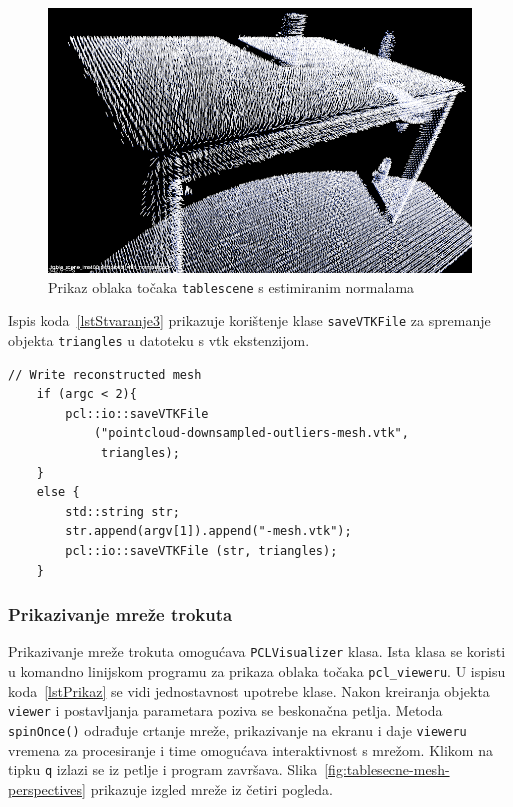 
\begin{figure}[h]
\centering
\includegraphics[scale=0.5]{figures/tablescene-normals.png}
\caption{Prikaz oblaka točaka \texttt{tablescene} s estimiranim
normalama }
\label{fig:tablescene-normals}
\end{figure}

Ispis koda~\ref{lstStvaranje3} prikazuje korištenje klase
\texttt{saveVTKFile} za spremanje objekta \texttt{triangles} u datoteku
s vtk ekstenzijom.

\begin{lstlisting}[label=lstStvaranje3,caption={Dio izvornog koda o
    zapisivanju mreže iz funkcije \texttt{reconstruct\_mesh()} }]
    // Write reconstructed mesh
    if (argc < 2){
        pcl::io::saveVTKFile
            ("pointcloud-downsampled-outliers-mesh.vtk",
             triangles);
    }
    else {
        std::string str;
        str.append(argv[1]).append("-mesh.vtk");
        pcl::io::saveVTKFile (str, triangles);
    }
\end{lstlisting}


\subsubsection{Prikazivanje mreže trokuta} %
\label{ssub:Prikazivanje mreže trokuta}
Prikazivanje mreže trokuta omogućava \texttt{PCLVisualizer} klasa. Ista
klasa se koristi u komandno linijskom programu za prikaza oblaka točaka
\texttt{pcl\_vieweru}. U ispisu koda~\ref{lstPrikaz} se vidi
jednostavnost upotrebe klase. Nakon kreiranja objekta \texttt{viewer} i
postavljanja parametara poziva se beskonačna petlja. Metoda
\texttt{spinOnce()} odrađuje crtanje mreže, prikazivanje na ekranu i
daje \texttt{vieweru} vremena za procesiranje i time omogućava
interaktivnost s mrežom. Klikom na tipku \texttt{q} izlazi se iz petlje
i program završava.  Slika~\ref{fig:tablesecne-mesh-perspectives}
prikazuje izgled mreže iz četiri pogleda.


